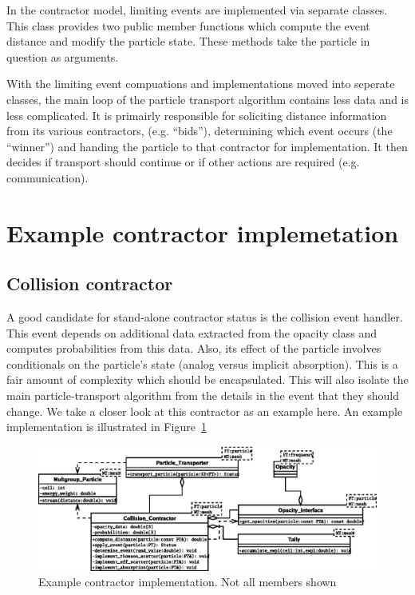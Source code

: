 \documentclass[memo]{ResearchNote}
\begin{document}
In the contractor model, limiting events are implemented via separate
classes. This class provides two public member functions which compute
the event distance and modify the particle state. These methods take
the particle in question as arguments.

With the limiting event compuations and implementations moved into
seperate classes, the main loop of the particle transport algorithm
contains less data and is less complicated. It is primairly
responsible for soliciting distance information from its various
contractors, (e.g. ``bids''), determining which event occurs (the
``winner'') and handing the particle to that contractor for
implementation. It then decides if transport should continue or if
other actions are required (e.g. communication).

\section{Example contractor implemetation}

\subsection{Collision contractor}

A good candidate for stand-alone contractor status is the collision
event handler. This event depends on additional data extracted from
the opacity class and computes probabilities from this data. Also,
its effect of the particle involves conditionals on the particle's
state (analog versus implicit absorption). This is a fair amount of
complexity which should be encapsulated. This will also isolate the
main particle-transport algorithm from the details in the event that
they should change. We take a closer look at this contractor as an
example here. An example implementation is illustrated in
Figure~\ref{fig:collision_contractor}

\begin{center}
  \begin{figure}
    \includegraphics[width=6.5in]{figures/collision_contractor.eps}
    \caption{Example contractor implementation. Not all members shown} 
    \label{fig:collision_contractor}
  \end{figure}
\end{center}
\end{document}
